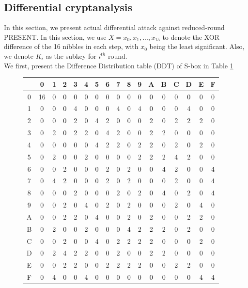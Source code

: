 \documentclass[preprint]{transcrypto}
\begin{document}
\subsection{Differential cryptanalysis \textsuperscript{\cite{8} \cite{4} \cite{1} \cite{2} \cite{6}}}
In this section, we present actual differential attack against reduced-round PRESENT. In this section, we use $X = x_0,x_1,...,x_15$ to denote the XOR difference of the 16 nibbles in each step, with $x_0$ being the least significant. Also, we denote $K_i$ as the subkey for $i^{th}$ round. \\
We first, present the Difference Distribution table (DDT) of S-box in Table {\ref{fig:ddt}}
\begin{figure}[h!]
    \centering
    
    \begin{tabular}{ |c||c|c|c|c|c|c|c|c|c|c|c|c|c|c|c|c| }
        \hline
         & 0 & 1 & 2 & 3&4& 5& 6&7&8&9&A&B&C&D&E&F  \\ \hline \hline
         0& 16 & 0 & 0 & 0 &0 &0 &0 &0& 0& 0 &0& 0& 0 &0& 0& 0 \\ 
         1& 0 & 0 & 0 & 4 & 0 & 0 & 0 & 4 & 0 & 4 &0& 0& 0 &4& 0& 0 \\
         2& 0 & 0 & 0 & 2 & 0 & 4 & 2 & 0 & 0 & 0 &2& 0& 2 &2& 2& 0 \\
         3& 0 & 2 & 0 & 2 & 2 & 0 & 4 & 2 & 0 & 0 &2& 2& 0 &0& 0& 0 \\
         4& 0 & 0 & 0 & 0 & 0 & 4 & 2 & 2 & 0 & 2 &2& 0& 2 &0& 2& 0 \\
         5& 0 & 2 & 0 & 0 & 2 & 0 & 0 & 0 & 0 & 2 &2& 2& 4 &2& 0& 0 \\
         6& 0 & 0 & 2 & 0 & 0 & 0 & 2 & 0 & 2 & 0 &0& 4& 2 &0& 0& 4 \\
         7& 0 & 4 & 2 & 0 & 0 & 0 & 2 & 0 & 2 & 0 & 0 & 0 & 2 & 0 & 0 & 4\\
         
         8& 0 & 0 & 0 & 2 & 0 & 0 & 0 & 2 & 0 & 2 & 0 & 4 & 0 & 2 & 0 & 4\\
         9& 0 & 0 & 2 & 0 & 4 & 0 & 2 & 0 & 2 & 0 & 0 & 0 & 2 & 0 & 4 & 0\\
         A& 0 & 0 & 2 & 2 & 0 & 4 & 0 & 0 & 2 & 0 & 2 & 0 & 0 & 2 & 2 & 0\\
         B& 0 & 2 & 0 & 0 & 2 & 0 & 0 & 0 & 4 & 2 & 2 & 2 & 0 & 2 & 0 & 0\\
         C& 0 & 0 & 2 & 0 & 0 & 4 & 0 & 2 & 2 & 2 & 2 & 0 & 0 & 0 & 2 & 0\\
         D& 0 & 2 & 4 & 2 & 2 & 0 & 0 & 2 & 0 & 0 & 2 & 2 & 0 & 0 & 0 & 0\\
         E& 0 & 0 & 2 & 2 & 0 & 0 & 2 & 2 & 2 & 2 & 0 & 0 & 2 & 2 & 0 & 0\\
         F& 0 & 4 & 0 & 0 & 4 & 0 & 0 & 0 & 0 & 0 & 0 & 0 & 0 & 0 & 4 & 4\\ \hline
    \end{tabular}
    \label{fig:ddt}
\end{figure}
\end{document}
